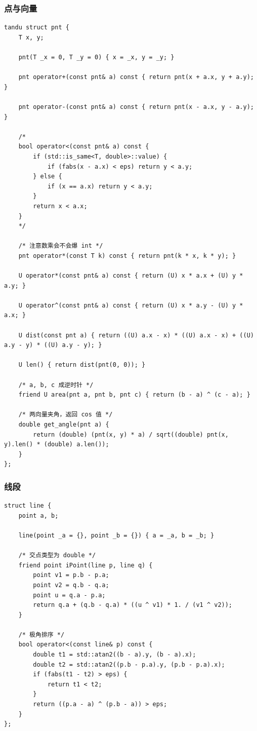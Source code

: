 \documentclass[UTF8, a4paper, titlepage, twoside]{ctexart}
\begin{document}
\subsubsection*{ 点与向量 }
\begin{lstlisting}[style=cpp]
tandu struct pnt {
    T x, y;

    pnt(T _x = 0, T _y = 0) { x = _x, y = _y; }

    pnt operator+(const pnt& a) const { return pnt(x + a.x, y + a.y); }

    pnt operator-(const pnt& a) const { return pnt(x - a.x, y - a.y); }

    /*
    bool operator<(const pnt& a) const {
        if (std::is_same<T, double>::value) {
            if (fabs(x - a.x) < eps) return y < a.y;
        } else {
            if (x == a.x) return y < a.y;
        }
        return x < a.x;
    }
    */

    /* 注意数乘会不会爆 int */
    pnt operator*(const T k) const { return pnt(k * x, k * y); }

    U operator*(const pnt& a) const { return (U) x * a.x + (U) y * a.y; }

    U operator^(const pnt& a) const { return (U) x * a.y - (U) y * a.x; }

    U dist(const pnt a) { return ((U) a.x - x) * ((U) a.x - x) + ((U) a.y - y) * ((U) a.y - y); }

    U len() { return dist(pnt(0, 0)); }

    /* a, b, c 成逆时针 */
    friend U area(pnt a, pnt b, pnt c) { return (b - a) ^ (c - a); }

    /* 两向量夹角，返回 cos 值 */
    double get_angle(pnt a) {
        return (double) (pnt(x, y) * a) / sqrt((double) pnt(x, y).len() * (double) a.len());
    }
};
\end{lstlisting}

\subsubsection*{ 线段 }

\begin{lstlisting}[style=cpp]
struct line {
    point a, b;

    line(point _a = {}, point _b = {}) { a = _a, b = _b; }

    /* 交点类型为 double */
    friend point iPoint(line p, line q) {
        point v1 = p.b - p.a;
        point v2 = q.b - q.a;
        point u = q.a - p.a;
        return q.a + (q.b - q.a) * ((u ^ v1) * 1. / (v1 ^ v2));
    }

    /* 极角排序 */
    bool operator<(const line& p) const {
        double t1 = std::atan2((b - a).y, (b - a).x);
        double t2 = std::atan2((p.b - p.a).y, (p.b - p.a).x);
        if (fabs(t1 - t2) > eps) {
            return t1 < t2;
        }
        return ((p.a - a) ^ (p.b - a)) > eps;
    }
};
\end{lstlisting}
\end{document}
